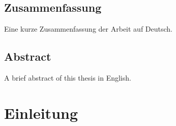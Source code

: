 \documentclass[%
thesis=student,%
coverpage=false,%
titlepage=false,%
headmarks=true, %
german,%
font=libertine, %
math=newpxtx, %
BCOR=5mm,%
coverBCOR=11mm%
]{tumbook}
\theoremstyle{break}
\begin{document}
\section*{Zusammenfassung}
Eine kurze Zusammenfassung der Arbeit auf Deutsch.

\section*{Abstract}
A brief abstract of this thesis in English.

\cleardoublepage{}

\tableofcontents

\mainmatter{}

\chapter{Einleitung}
\end{document}
